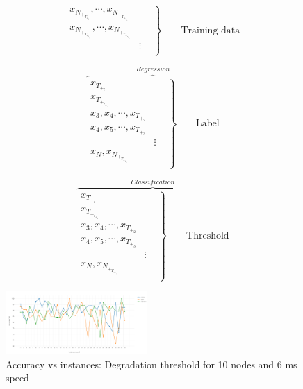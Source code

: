 \documentclass[letterpaper, 10 pt, conference]{ieeeconf}  %
\begin{document}
\begin{equation}
 \left.\begin{aligned}
        x_N_+_T_+_t, \cdots, x_N_+_T_+_2_t_-_1\\
        x_N_+_T_+_t_+_1, \cdots, x_N_+_T_+_2_t_-_1\\
        & \vdots& \\
       \end{aligned}
 \right\}
 \qquad \text{Training data}
\end{equation}


\begin{equation}
\overbrace{
 \left.\begin{aligned}
        x_T_+_t\\
        x_T_+_t_+_1\\
        x_3, x_4, \cdots, x_T_+_2\\
        x_4, x_5, \cdots, x_T_+_3\\
         & \vdots& \\
        x_N,x_N_+_T_-_1_+_t\\
       \end{aligned}
 \right\}
 \qquad \text{Label}
 }^{Regression}
\end{equation}




\begin{equation}
\overbrace{
 \left.\begin{aligned}
        x_T_+_t\\
        x_T_+_t_+_1\\
        x_3, x_4, \cdots, x_T_+_2\\
        x_4, x_5, \cdots, x_T_+_3\\
         & \vdots& \\
        x_N,x_N_+_T_-_1_+_t\\
       \end{aligned}
 \right\}
 \qquad \text{Threshold}
 }^{Classification}
\end{equation}

\begin{figure}[H]
\includegraphics[width=0.48\textwidth]{10Nodes06accuracy}
\caption{Accuracy vs instances: Degradation threshold for 10 nodes and 6 ms speed}
\label{fig:10Nodes06accuracy}
\end{figure}
\end{document}
